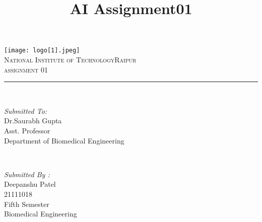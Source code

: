 \documentclass[12pt]{article}
\title{AI Assignment01}
\begin{document}

\begin{titlepage}
	\centering
    \vspace*{0.5 cm}
    \texttt{[image: logo[1].jpeg]}\\[1.0 cm]	%
    
    \textsc{\LARGE  National Institute of Technology\newline\newline Raipur}\\[2.0 cm]	%
	\textsc{\Large assignment 01}\\[0.5 cm]				%
	\rule{\linewidth}{0.2 mm} \\[0.4 cm]

	
	\begin{minipage}{0.4\textwidth}
		\begin{flushleft} \large
			\emph{Submitted To:}\\
			Dr.Saurabh Gupta\\
            Asst. Professor\\
            Department of Biomedical Engineering\\
			\end{flushleft}
			\end{minipage}~
			\begin{minipage}{0.4\textwidth}
            
			\begin{flushright} \large
			\emph{Submitted By :} \\
			Deepanshu Patel\\
            21111018\\
        Fifth Semester\\
        Biomedical Engineering\\
		\end{flushright}
        
	\end{minipage}\\[2 cm]
	

\end{titlepage}



\newpage


\end{document}
